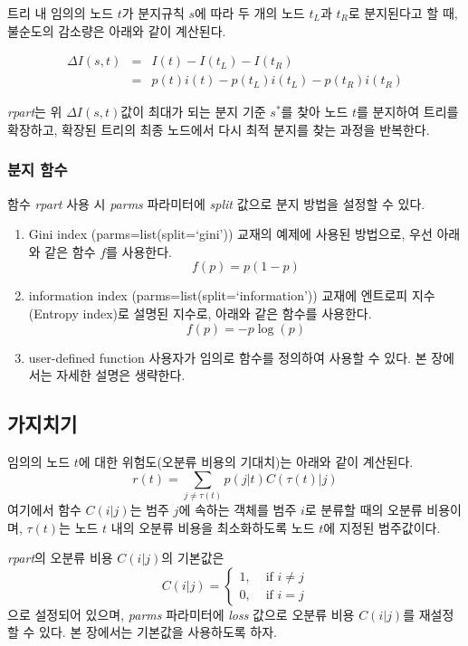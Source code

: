 \documentclass[]{book}
\providecommand{\tightlist}{%
  \setlength{\itemsep}{0pt}\setlength{\parskip}{0pt}}
\begin{document}
트리 내 임의의 노드 \(t\)가 분지규칙 \(s\)에 따라 두 개의 노드 \(t_L\)과 \(t_R\)로 분지된다고 할 때, 불순도의 감소량은 아래와 같이 계산된다.

\begin{eqnarray}
\Delta I(s,t) &=& I(t) - I(t_L) - I(t_R)\\ &=& p(t)i(t) - p(t_L)i(t_L) - p(t_R)i(t_R) 
\end{eqnarray}

\emph{rpart}는 위 \(\Delta I(s,t)\)값이 최대가 되는 분지 기준 \(s^*\)를 찾아 노드 \(t\)를 분지하여 트리를 확장하고, 확장된 트리의 최종 노드에서 다시 최적 분지를 찾는 과정을 반복한다.

\hypertarget{-}{%
\subsubsection{분지 함수}\label{-}}

함수 \emph{rpart} 사용 시 \emph{parms} 파라미터에 \emph{split} 값으로 분지 방법을 설정할 수 있다.

\begin{enumerate}
\def\labelenumi{\arabic{enumi}.}
\tightlist
\item
  Gini index (parms=list(split=`gini'))
  교재의 예제에 사용된 방법으로, 우선 아래와 같은 함수 \(f\)를 사용한다.
  \[f(p) = p(1-p)\]
\item
  information index (parms=list(split=`information'))
  교재에 엔트로피 지수(Entropy index)로 설명된 지수로, 아래와 같은 함수를 사용한다.
  \[f(p) = -p\log(p)\]
\item
  user-defined function
  사용자가 임의로 함수를 정의하여 사용할 수 있다. 본 장에서는 자세한 설명은 생략한다.
\end{enumerate}

\hypertarget{cart-r-pkg-pruning}{%
\subsection{가지치기}\label{cart-r-pkg-pruning}}

임의의 노드 \(t\)에 대한 위험도(오분류 비용의 기대치)는 아래와 같이 계산된다.
\[r(t) = \sum_{j \neq \tau(t)} p(j|t)C\left(\tau(t)|j\right)\]
여기에서 함수 \(C(i|j)\)는 범주 \(j\)에 속하는 객체를 범주 \(i\)로 분류할 때의 오분류 비용이며, \(\tau(t)\)는 노드 \(t\) 내의 오분류 비용을 최소화하도록 노드 \(t\)에 지정된 범주값이다.

\emph{rpart}의 오분류 비용 \(C(i|j)\)의 기본값은
\[C(i|j) = 
\begin{cases} 1,  & \text{  if } i \neq j\\
              0,  & \text{  if } i = j
\end{cases} \]
으로 설정되어 있으며, \emph{parms} 파라미터에 \emph{loss} 값으로 오분류 비용 \(C(i|j)\)를 재설정할 수 있다. 본 장에서는 기본값을 사용하도록 하자.
\end{document}
